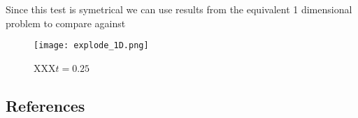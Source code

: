 Since this test is symetrical we can use results from the equivalent 1 dimensional problem to compare against

\begin{figure}
  \texttt{[image: explode\_1D.png]}
  \caption{XXX$t=0.25$}
  \label{fig:1dExplode}
\end{figure}

\newpage



%
%
%
%
%
%
%


\subsection{References}




